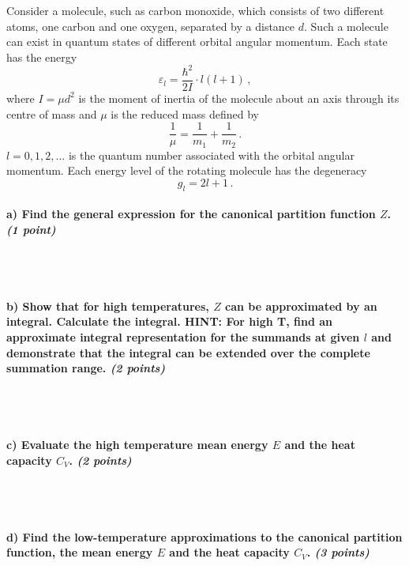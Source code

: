 Consider a molecule, such as carbon monoxide, which consists of two 
different atoms, one carbon and one oxygen, separated by a distance $d$. 
Such a molecule can exist in quantum states of different orbital angular 
momentum. Each state has the energy
\begin{equation}
    \varepsilon_l=\frac{\hbar^2}{2I}\cdot l(l+1) \,,
\end{equation}
where $I=\mu d^2$ is the moment of inertia of the molecule about an axis 
through its centre of mass and $\mu$ is the reduced mass defined by 
\begin{equation}
    \frac{1}{\mu}=\frac{1}{m_1}+\frac{1}{m_2} \,.
\end{equation}
$l=0,1,2,...$ is the quantum number associated with the orbital angular 
momentum. Each energy level of the rotating molecule has the degeneracy
\begin{equation}
    g_l=2l+1 \,.
\end{equation}

\paragraph{a) Find the general expression for the canonical partition 
    function $Z$. \textit{(1 point)}
} \ \\
\\

\paragraph{b) Show that for high temperatures, $Z$ can be approximated 
    by an integral. Calculate the integral. HINT: For high T, find an 
    approximate integral representation for the summands at given $l$ and
    demonstrate that the integral can be extended over the complete 
    summation range. \textit{(2 points)}
} \ \\
\\

\paragraph{c) Evaluate the high temperature mean energy $E$ and the heat 
    capacity $C_V$. \textit{(2 points)}
} \ \\
\\

\paragraph{d) Find the low-temperature approximations to the canonical 
    partition function, the mean energy $E$ and the heat capacity $C_V$.
    \textit{(3 points)}
} \ \\
\\
